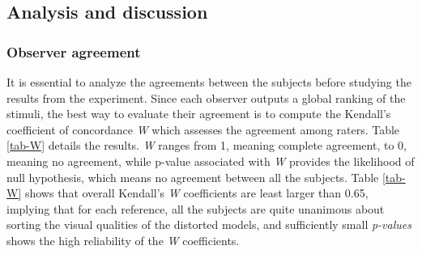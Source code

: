 \subsection{Analysis and discussion}
\subsubsection{Observer agreement}
It is essential to analyze the agreements between the subjects before studying the results from the experiment. Since each observer outputs a global ranking of the stimuli, the best way to evaluate their agreement is to compute the Kendall's coefficient of concordance \textit{W} \cite{Kendall_1940} which assesses the agreement among raters. Table \ref{tab-W} details the results. \textit{W} ranges from 1, meaning complete agreement, to 0, meaning no agreement, while p-value associated with \textit{W} provides the likelihood of null hypothesis, which means no agreement between all the subjects. Table \ref{tab-W} shows that overall Kendall’s \textit{W} coefficients are least larger than 0.65, implying that for each reference, all the subjects are quite unanimous about sorting the visual qualities of the distorted models, and sufficiently small \textit{p-values} shows the high reliability of the \textit{W} coefficients.\\
